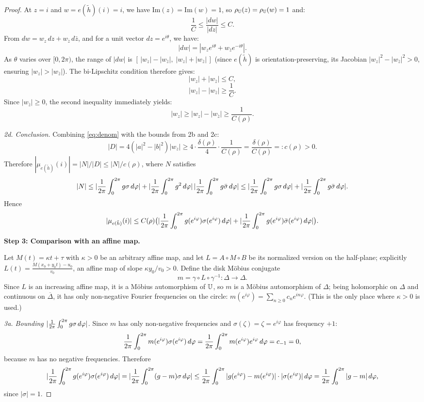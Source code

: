 \begin{proof}
	At $z = i$ and $w = e(\tilde{h})(i) = i$, we have $\mathrm{Im}(z) = \mathrm{Im}(w) = 1$, so $\rho_{\mathbb{U}}(z) = \rho_{\mathbb{U}}(w) = 1$ and:
	\[
	\frac{1}{C} \leq \frac{|dw|}{|dz|} \leq C.
	\]
	From $dw = w_z\,dz + w_{\bar{z}}\,d\bar{z}$, and for a unit vector $dz = e^{i\theta}$, we have:
	\[
	|dw| = |w_z e^{i\theta} + w_{\bar{z}} e^{-i\theta}|.
	\]
	As $\theta$ varies over $[0, 2\pi)$, the range of $|dw|$ is $[\,|w_z| - |w_{\bar{z}}|,\; |w_z| + |w_{\bar{z}}|\,]$ (since $e(\tilde{h})$ is orientation-preserving, its Jacobian $|w_z|^2 - |w_{\bar{z}}|^2 > 0$, ensuring $|w_z| > |w_{\bar{z}}|$). The bi-Lipschitz condition therefore gives:
	\[
	|w_z| + |w_{\bar{z}}| \leq C ,
	\]
	\[
	|w_z| - |w_{\bar{z}}| \geq \frac{1}{C} .
	\]
	Since $|w_{\bar{z}}| \geq 0$, the second inequality immediately yields:
	\[
	|w_z| \geq |w_z| - |w_{\bar{z}}| \geq \frac{1}{C(\rho)}.
	\]
	
	\medskip
	\noindent\textit{2d. Conclusion.}
	Combining \eqref{eq:denom} with the bounds from 2b and 2c:
	\[
	|D| = 4(|a|^2 - |b|^2)|w_z| \geq 4 \cdot \frac{\delta(\rho)}{4} \cdot \frac{1}{C(\rho)} = \frac{\delta(\rho)}{C(\rho)} =: c(\rho) > 0.
	\]
	Therefore $|\mu_{e(\tilde{h})}(i)| = |N|/|D| \leq |N|/c(\rho)$, where  $N$ satisfies
	\[
	|N| \leq |\frac{1}{2\pi}\int_0^{2\pi} g\sigma \,d\varphi| + |\frac{1}{2\pi}\int_0^{2\pi} g^2 \,d\varphi|\,|\frac{1}{2\pi}\int_0^{2\pi} g\bar{\sigma} \,d\varphi| \leq |\frac{1}{2\pi}\int_0^{2\pi} g\sigma \,d\varphi| + |\frac{1}{2\pi}\int_0^{2\pi} g\bar{\sigma} \,d\varphi|.
	\]
	Hence
	\[
	|\mu_{e(\tilde{h})}(i)| \leq C(\rho)\big(|\frac{1}{2\pi}\int_0^{2\pi} g(e^{i\varphi})\sigma(e^{i\varphi}) \,d\varphi| + |\frac{1}{2\pi}\int_0^{2\pi} g(e^{i\varphi})\bar{\sigma}(e^{i\varphi}) \,d\varphi|\big).
	\]
	
	
	
	\textbf{Step 3: Comparison with an affine map.}
	
	Let $M(t) = \kappa t + \tau$ with $\kappa > 0$ be an arbitrary affine map, and let $L = A \circ M \circ B$ be its normalized version on the half-plane; explicitly $L(t)=\frac{M(x_0+y_0t)-u_0}{v_0}$, an affine map of slope $\kappa y_0/v_0>0$. Define the disk M\"obius conjugate
	\[
	m = \gamma \circ L \circ \gamma^{-1}: \Delta \to \Delta.
	\]
	Since $L$ is an increasing affine map, it is a M\"obius automorphism of $\mathbb{U}$, so $m$ is a M\"obius automorphism of $\Delta$; being holomorphic on $\Delta$ and continuous on $\overline\Delta$, it has only non-negative Fourier frequencies on the circle: $m(e^{i\varphi}) = \sum_{n \geq 0} c_n e^{in\varphi}$. (This is the only place where $\kappa>0$ is used.)
	
	\medskip
	\noindent\textit{3a. Bounding $|\frac{1}{2\pi}\int_0^{2\pi} g\sigma \,d\varphi|$.}
	Since $m$ has only non-negative frequencies and $\sigma(\zeta) = \zeta = e^{i\varphi}$ has frequency $+1$:
	\[
	\frac{1}{2\pi}\int_0^{2\pi} m(e^{i\varphi})\sigma(e^{i\varphi}) \,d\varphi = \frac{1}{2\pi}\int_0^{2\pi} m(e^{i\varphi})e^{i\varphi} \,d\varphi = c_{-1} = 0,
	\]
	because $m$ has no negative frequencies. Therefore
	\[
	|\frac{1}{2\pi}\int_0^{2\pi} g(e^{i\varphi})\sigma(e^{i\varphi}) \,d\varphi| = |\frac{1}{2\pi}\int_0^{2\pi} (g - m)\sigma \,d\varphi| \leq \frac{1}{2\pi}\int_0^{2\pi} |g(e^{i\varphi}) - m(e^{i\varphi})| \cdot |\sigma(e^{i\varphi})| \,d\varphi = \frac{1}{2\pi}\int_0^{2\pi} |g - m| \,d\varphi,
	\]
	since $|\sigma|=1$.
	

\end{proof}
